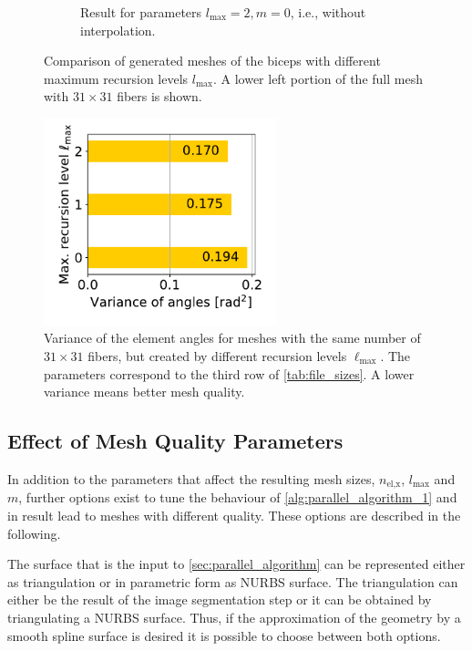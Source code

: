 \begin{figure}
\begin{subfigure}[t]{0.45\textwidth}
    \caption{Result for parameters $l_\text{max}=2, m=0$, i.e., without interpolation.}%
    \label{fig:31x31_l2_center}%
  \end{subfigure}   
   
  \caption{Comparison of generated meshes of the biceps with different maximum recursion levels $l_\text{max}$. A lower left portion of the full mesh with $31 \times 31$ fibers is shown.}%
  \label{fig:different_recursion_levels}%
\end{figure}%

\begin{figure}%
  \centering%
  \includegraphics[height=6cm]{images/parallel_fiber_estimation/mesh_quality_recursion_level.pdf}%
  \caption{Variance of the element angles for meshes with the same number of $31 \times 31$ fibers, but created by different recursion levels $\ell_\text{max}$. The parameters correspond to the third row of \cref{tab:file_sizes}. A lower variance means better mesh quality.}%
  \label{fig:2mesh_quality}%
\end{figure}%

\subsection{Effect of Mesh Quality Parameters}\label{sec:mesh_generation_mesh_quality_parameters}

In addition to the parameters that affect the resulting mesh sizes, $n_\text{el,x}$, $l_\text{max}$ and $m$, further options exist to tune the behaviour of \cref{alg:parallel_algorithm_1} and in result lead to meshes with different quality. These options are described in the following.

The surface that is the input to \cref{sec:parallel_algorithm} can be represented either as triangulation or in parametric form as NURBS surface. The triangulation can either be the result of the image segmentation step or it can be obtained by triangulating a NURBS surface. Thus, if the approximation of the geometry by a smooth spline surface is desired 
it is possible to choose between both options. 

